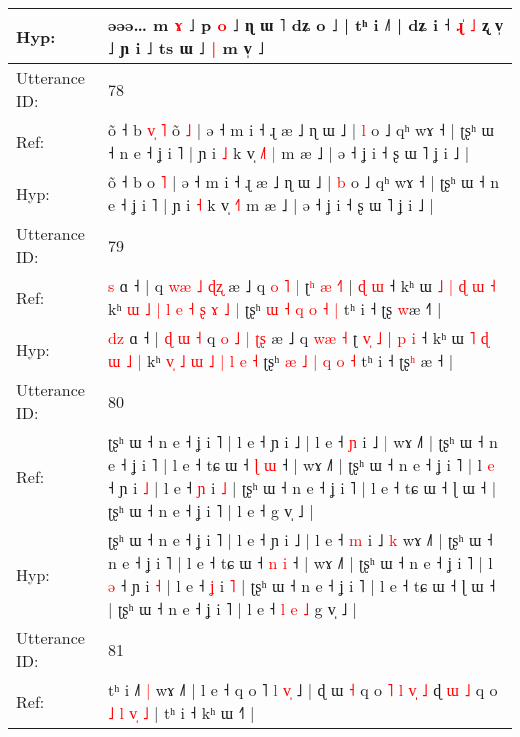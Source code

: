 \documentclass[10pt]{article}
\DeclareRobustCommand{\hl}[1]{{\textcolor{red}{#1}}}
\begin{document}
\begin{longtable}{ll}
 \\
Hyp: & əəə… m \hl{ɤ} ˩ p \hl{}\hl{o} ˩ ɳ ɯ ˥ dʑ o ˩ | tʰ i ˩˥ | dʑ i ˧\hl{}\hl{} \hl{}\hl{ɻ}\hl{̍} \hl{˩} ʐ v̩ ˩ ɲ i ˩ ts ɯ ˩\hl{ }\hl{|} m v̩ ˩\hl{}\hl{}
 \\
\midrule
Utterance ID: & 78 \\
Ref: & õ ˧ b\hl{ }\hl{v}\hl{̩}\hl{ }\hl{˥} o\hl{̃} \hl{˩} | ə ˧ m i ˧ ɻ æ ˩ ɳ ɯ ˩ | \hl{l} o ˩ qʰ wɤ ˧ | ʈʂʰ ɯ ˧ n e ˧ ʝ i ˥ | ɲ i \hl{˩} k v̩ \hl{˩}˥\hl{ }\hl{|} m æ ˩ | ə ˧ ʝ i ˧ ʂ ɯ ˥ ʝ i ˩ |
 \\
Hyp: & õ ˧ b\hl{}\hl{}\hl{}\hl{}\hl{} o\hl{} \hl{˥} | ə ˧ m i ˧ ɻ æ ˩ ɳ ɯ ˩ | \hl{b} o ˩ qʰ wɤ ˧ | ʈʂʰ ɯ ˧ n e ˧ ʝ i ˥ | ɲ i \hl{˧} k v̩ \hl{˧}˥\hl{}\hl{} m æ ˩ | ə ˧ ʝ i ˧ ʂ ɯ ˥ ʝ i ˩ |
 \\
\midrule
Utterance ID: & 79 \\
Ref: & \hl{}\hl{s} ɑ ˧ |\hl{}\hl{}\hl{}\hl{}\hl{}\hl{} q \hl{}\hl{w}\hl{æ} \hl{˩} \hl{ɖ}\hl{ʐ} æ ˩ q \hl{o}\hl{ }\hl{˥} \hl{|} ʈ\hl{ʰ} \hl{æ}\hl{ }\hl{˧}\hl{˥} | \hl{ɖ} \hl{ɯ} ˧ kʰ ɯ \hl{˩} \hl{|} \hl{ɖ} \hl{ɯ} \hl{˧} kʰ\hl{ }\hl{ɯ} \hl{˩}\hl{ }\hl{|} \hl{l} \hl{e} \hl{˧} \hl{ʂ} \hl{ɤ} \hl{˩} \hl{|} ʈʂʰ \hl{ɯ} \hl{˧} \hl{q} \hl{o} \hl{˧} \hl{|} tʰ i ˧ ʈʂ\hl{ }\hl{w}æ ˧\hl{˥} |
 \\
Hyp: & \hl{d}\hl{z} ɑ ˧ |\hl{ }\hl{ɖ}\hl{ }\hl{ɯ}\hl{ }\hl{˧} q \hl{o}\hl{ }\hl{˩} \hl{|} \hl{ʈ}\hl{ʂ} æ ˩ q \hl{}\hl{w}\hl{æ} \hl{˧} ʈ\hl{} \hl{v}\hl{̩}\hl{ }\hl{˩} | \hl{p} \hl{i} ˧ kʰ ɯ \hl{˥} \hl{ɖ} \hl{ɯ} \hl{˩} \hl{|} kʰ\hl{}\hl{} \hl{}\hl{v}\hl{̩} \hl{˩} \hl{ɯ} \hl{˩} \hl{|} \hl{l} \hl{e} \hl{˧} ʈʂʰ \hl{æ} \hl{˩} \hl{|} \hl{q} \hl{o} \hl{˧} tʰ i ˧ ʈʂ\hl{ʰ}\hl{ }æ ˧\hl{} |
 \\
\midrule
Utterance ID: & 80 \\
Ref: & ʈʂʰ ɯ ˧ n e ˧ ʝ i ˥ | l e ˧ ɲ i ˩ | l e ˧ \hl{ɲ} i ˩ \hl{|} wɤ ˩˥ | ʈʂʰ ɯ ˧ n e ˧ ʝ i ˥ | l e ˧ tɕ ɯ ˧ \hl{ɭ} \hl{ɯ} ˧ | wɤ ˩˥ | ʈʂʰ ɯ ˧ n e ˧ ʝ i ˥ | l \hl{e} ˧ ɲ i \hl{˩} | l e ˧ \hl{ɲ} i \hl{˩} | ʈʂʰ ɯ ˧ n e ˧ ʝ i ˥ | l e ˧ tɕ ɯ ˧ ɭ ɯ ˧ | ʈʂʰ ɯ ˧ n e ˧ ʝ i ˥ | l e ˧\hl{}\hl{}\hl{}\hl{}\hl{}\hl{} g v̩ ˩ |
 \\
Hyp: & ʈʂʰ ɯ ˧ n e ˧ ʝ i ˥ | l e ˧ ɲ i ˩ | l e ˧ \hl{m} i ˩ \hl{k} wɤ ˩˥ | ʈʂʰ ɯ ˧ n e ˧ ʝ i ˥ | l e ˧ tɕ ɯ ˧ \hl{n} \hl{i} ˧ | wɤ ˩˥ | ʈʂʰ ɯ ˧ n e ˧ ʝ i ˥ | l \hl{ə} ˧ ɲ i \hl{˧} | l e ˧ \hl{ʝ} i \hl{˥} | ʈʂʰ ɯ ˧ n e ˧ ʝ i ˥ | l e ˧ tɕ ɯ ˧ ɭ ɯ ˧ | ʈʂʰ ɯ ˧ n e ˧ ʝ i ˥ | l e ˧\hl{ }\hl{l}\hl{ }\hl{e}\hl{ }\hl{˩} g v̩ ˩ |
 \\
\midrule
Utterance ID: & 81 \\
Ref: & tʰ i ˩˥\hl{ }\hl{|} wɤ ˩˥ | l e ˧ q o ˥ \hl{l} \hl{v}\hl{̩} ˩ | ɖ ɯ\hl{ }\hl{˧} q o \hl{˥} \hl{l} \hl{v}\hl{̩} \hl{˩} ɖ \hl{}\hl{ɯ} \hl{˩} q o\hl{ }\hl{˩}\hl{ }\hl{l}\hl{ }\hl{v}\hl{̩} \hl{˩} | tʰ i ˧ kʰ ɯ ˧˥ |

\end{longtable}
\end{document}
